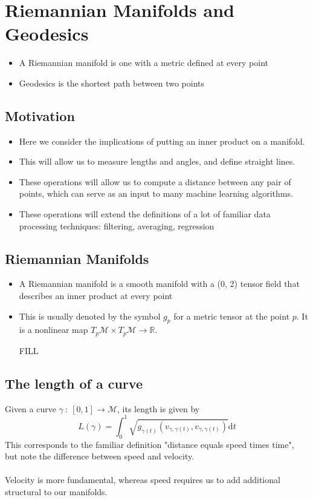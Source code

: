 \documentclass[10pt]{article}
\newcommand{\R}{\mathbb{R}}
\newcommand{\dd}{\text{d}}
\begin{document}
\section*{Riemannian Manifolds and Geodesics}
\begin{itemize}
	\item A Riemannian manifold is one with a metric defined at every point
	\item Geodesics is the shortest path between two points
\end{itemize}

\subsection*{Motivation}
\begin{itemize}
	\item Here we consider the implications of putting an inner product on a manifold.
	\item This will allow us to measure lengths and angles, and define straight lines.
	\item These operations will allow us to compute a distance between any pair of points, which can serve as an input to many machine learning algorithms.
	\item These operations will extend the definitions of a lot of familiar data processing techniques: filtering, averaging, regression 
\end{itemize}

\subsection*{Riemannian Manifolds}
\begin{itemize}
	\item A Riemannian manifold is a smooth manifold with a (0, 2) tensor field that describes an inner product at every point
	\item This is usually denoted by the symbol $g_p$ for a metric tensor at the point $p$.  It is a nonlinear map $T_p \mathcal{M} \times T_p \mathcal{M} \rightarrow \R$.
	\item [FILL]
\end{itemize}

\subsection*{The length of a curve}
Given a curve $\gamma \::\: [0, 1] \rightarrow \mathcal{M}$, its length is given by
\[L(\gamma) = \int_0^1 \sqrt{g_{\gamma(t)}(v_{\gamma, \gamma(t)}, v_{\gamma, \gamma(t)})} \dd t\]
This corresponds to the familiar definition "distance equals speed times time", but note the difference between speed and velocity.\\\\
Velocity is more fundamental, whereas speed requires us to add additional structural to our manifolds.
\end{document}
